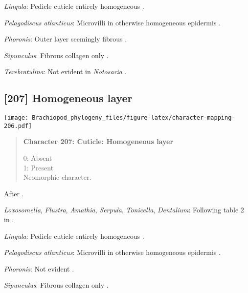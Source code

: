 \documentclass[openany]{book}
\theoremstyle{definition}
\theoremstyle{definition}
\theoremstyle{definition}
\theoremstyle{remark}
\begin{document}
\hypertarget{Lingula-coding-206}{}
\emph{Lingula}: Pedicle cuticle entirely homogeneous
\citep{Williams1997Introduction}.

\hypertarget{Pelagodiscus_atlanticus-coding-206}{}
\emph{Pelagodiscus atlanticus}: Microvilli in otherwise homogeneous
epidermis \citep{Williams1997Introduction}.

\hypertarget{Phoronis-coding-206}{}
\emph{Phoronis}: Outer layer seemingly fibrous \citep{BereiterHahn1984}.

\hypertarget{Sipunculus-coding-206}{}
\emph{Sipunculus}: Fibrous collagen only \citep{BereiterHahn1984}.

\hypertarget{Terebratulina-coding-206}{}
\emph{Terebratulina}: Not evident in \emph{Notosaria}
\citep{BereiterHahn1984, Williams1997Introduction}.

\subsection*{{[}207{]} Homogeneous layer}\label{homogeneous-layer}

\texttt{[image: Brachiopod\_phylogeny\_files/figure-latex/character-mapping-206.pdf]}

\begin{quote}
\textbf{Character 207: Cuticle: Homogeneous layer}

0: Absent\\
1: Present\\
Neomorphic character.
\end{quote}

After \citet{Borisanova2015}.

\hypertarget{Amathia-coding-207}{}
\emph{Loxosomella}, \emph{Flustra}, \emph{Amathia}, \emph{Serpula},
\emph{Tonicella}, \emph{Dentalium}: Following table 2 in
\citet{Borisanova2015}.

\hypertarget{Lingula-coding-207}{}
\emph{Lingula}: Pedicle cuticle entirely homogeneous
\citep{Williams1997Introduction}.

\hypertarget{Pelagodiscus_atlanticus-coding-207}{}
\emph{Pelagodiscus atlanticus}: Microvilli in otherwise homogeneous
epidermis \citep{Williams1997Introduction}.

\hypertarget{Phoronis-coding-207}{}
\emph{Phoronis}: Not evident \citep{BereiterHahn1984}.

\hypertarget{Sipunculus-coding-207}{}
\emph{Sipunculus}: Fibrous collagen only \citep{BereiterHahn1984}.
\end{document}

